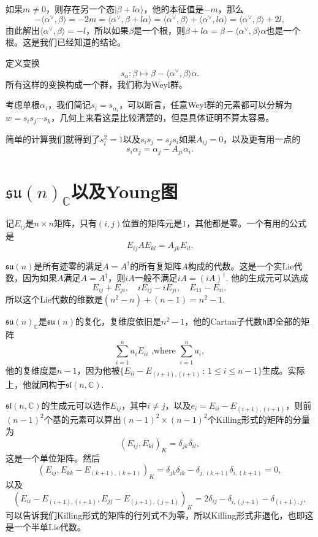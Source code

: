 \documentclass[9pt]{extarticle}
\newcommand{\cc}{\mathbb{C}}
\begin{document}
如果$m\neq 0$，则存在另一个态$|\beta+l\alpha\rangle$，他的本征值是$-m$，那么
\[
	-\langle \alpha^\vee,\beta\rangle=-2m=\langle \alpha^\vee,\beta+l\alpha\rangle=\langle \alpha^\vee,\beta\rangle+\langle \alpha^\vee,l\alpha\rangle=\langle \alpha^\vee,\beta\rangle+2l,
\]
由此解出$\langle \alpha^\vee,\beta\rangle=-l$，所以如果$\beta$是一个根，则$\beta+l\alpha=\beta-\langle \alpha^\vee,\beta\rangle\alpha$也是一个根。这是我们已经知道的结论。

\para 定义变换
\[
	s_\alpha:\beta\mapsto \beta-\langle \alpha^\vee,\beta\rangle\alpha.
\]
所有这样的变换构成一个群，我们称为Weyl群。

考虑单根$\alpha_i$，我们简记$s_i=s_{\alpha_i}$，可以断言，任意Weyl群的元素都可以分解为$w=s_is_j\cdots s_k$，几何上来看这是比较清楚的，但是具体证明不算太容易。

\para 简单的计算我们就得到了$s_i^2=1$以及$s_is_j=s_js_i$如果$A_{ij}=0$，以及更有用一点的
\[
	s_i\alpha_j=\alpha_j-A_{ji}\alpha_i.
\]

\section{$\mathfrak{su}(n)_\cc$以及Young图}

\para 记$E_{ij}$是$n\times n$矩阵，只有$(i,j)$位置的矩阵元是$1$，其他都是零。一个有用的公式是
\[
	E_{ij}AE_{kl}=A_{jk}E_{il}.
\]

\para $\mathfrak{su}(n)$是所有迹零的满足$A=A^\dag$的所有复矩阵$A$构成的代数。这是一个实Lie代数，因为如果$A$满足$A=A^\dag$，则$iA$一般不满足$iA=(iA)^\dag$. 他的生成元可以选成
\[
	E_{ij}+E_{ji},\quad iE_{ij}-iE_{ji},\quad E_{11}-E_{ii},
\]
所以这个Lie代数的维数是$(n^2-n)+(n-1)=n^2-1$.

\para $\mathfrak{su}(n)_\cc$是$\mathfrak{su}(n)$的复化，复维度依旧是$n^2-1$，他的Cartan子代数$\mathfrak{h}$即全部的矩阵
\[
	\sum_{i=1}^n a_i E_{ii} \text{ ,where } \sum_{i=1}^n  a_i,
\]
他的复维度是$n-1$，因为他被$\{E_{ii}-E_{(i+1),(i+1)}\,:\, 1\leq i \leq n-1\}$生成。实际上，他就同构于$\mathfrak{sl}(n,\cc)$.

$\mathfrak{sl}(n,\cc)$的生成元可以选作$E_{ij}$，其中$i\neq j$，以及$e_i=E_{ii}-E_{(i+1),(i+1)}$，则前$(n-1)^2$个基的元素可以算出$(n-1)^2\times (n-1)^2$个Killing形式的矩阵的分量为
\[
	(E_{ij},E_{kl})_K=\delta_{jk}\delta_{il},
\]
这是一个单位矩阵。然后
\[
	(E_{ij},E_{kk}-E_{(k+1),(k+1)})_K=\delta_{jk}\delta_{ik}-\delta_{j,(k+1)}\delta_{i,(k+1)}=0,
\]
以及
\[
	(E_{ii}-E_{(i+1),(i+1)},E_{jj}-E_{(j+1),(j+1)})_K=2\delta_{ij}-\delta_{i,(j+1)}-\delta_{(i+1),j},
\]
可以告诉我们Killing形式的矩阵的行列式不为零，所以Killing形式非退化，也即这是一个半单Lie代数。
\end{document}
